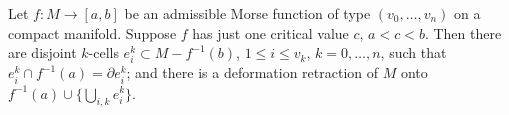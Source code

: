 Let $f: M \rightarrow [a,b]$ be an admissible Morse function of type $(v_0, \ldots, v_n)$ on a compact manifold. Suppose $f$ has just one critical value $c$, $a < c < b$. Then there are disjoint $k$-cells $e_i^k \subset M - f^{-1}(b)$, $1 \leq i \leq v_k$, $k = 0, \ldots, n$, such that $e_i^k \cap f^{-1}(a) = \partial e_i^k$; and there is a deformation retraction of $M$ onto $f^{-1}(a) \cup \{ \bigcup_{i,k} e_i^k \}$.
